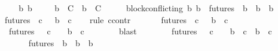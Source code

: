 \begin{isabellebody}
\isamarkupfalse%
\ {\isacharminus}\isanewline
\ \ \isamarkupfalse%
\ b{}\ b{}\ {\isasymsigma}\isanewline
\ \ \isamarkupfalse%
\ {\isachardoublequoteopen}b{}\ {\isasymin}\ C\ {\isasymand}\ b{}\ {\isasymin}\ C\ {\isasymand}\ {\isasymsigma}\ {\isasymin}\ {\isasymSigma}{\isachardoublequoteclose}\ \ {\isachardoublequoteopen}block{\isacharunderscore}conflicting\ {\isacharparenleft}b{}{\isacharcomma}\ b{}{\isacharparenright}{\isachardoublequoteclose}\ \ {\isachardoublequoteopen}{\isasymforall}{\isasymsigma}{\isasymin}futures\ {\isasymsigma}{\isachardot}\ {\isasymforall}b{\isacharprime}{\isasymin}{\isasymepsilon}\ {\isasymsigma}{\isachardot}\ b{}\ {\isasymdownharpoonright}\ b{\isacharprime}{\isachardoublequoteclose}\ \isanewline
\ \ \isamarkupfalse%
\ \ {\isachardoublequoteopen}{\isasymforall}{\isasymsigma}{\isasymin}futures\ {\isasymsigma}{\isachardot}\ {\isasymforall}c{\isasymin}{\isasymepsilon}\ {\isasymsigma}{\isachardot}\ {\isasymnot}\ b{}\ {\isasymdownharpoonright}\ c{\isachardoublequoteclose}\isanewline
\ \ \isamarkupfalse%
\ {\isacharparenleft}rule\ ccontr{\isacharparenright}\isanewline
\ \ \ \ \isamarkupfalse%
\ {\isachardoublequoteopen}{\isasymnot}\ {\isacharparenleft}{\isasymforall}{\isasymsigma}{\isasymin}futures\ {\isasymsigma}{\isachardot}\ {\isasymforall}c{\isasymin}{\isasymepsilon}\ {\isasymsigma}{\isachardot}\ {\isasymnot}\ b{}\ {\isasymdownharpoonright}\ c{\isacharparenright}{\isachardoublequoteclose}\isanewline
\ \ \ \ \isamarkupfalse%
\ {\isachardoublequoteopen}{\isasymexists}\ {\isasymsigma}\ {\isasymin}futures\ {\isasymsigma}{\isachardot}\ {\isasymexists}\ c\ {\isasymin}\ {\isasymepsilon}\ {\isasymsigma}{\isachardot}\ b{}\ {\isasymdownharpoonright}\ c{\isachardoublequoteclose}\isanewline
\ \ \ \ \ \ \isamarkupfalse%
\ blast\isanewline
\ \ \ \ \isamarkupfalse%
\ {\isachardoublequoteopen}{\isasymexists}\ {\isasymsigma}\ {\isasymin}futures\ {\isasymsigma}{\isachardot}\ {\isasymexists}\ c\ {\isasymin}\ {\isasymepsilon}\ {\isasymsigma}{\isachardot}\ b{}\ {\isasymdownharpoonright}\ c\ {\isasymand}\ b{}\ {\isasymdownharpoonright}\ c{\isachardoublequoteclose}\isanewline
\ \ \ \ \ \ \isamarkupfalse%
\ {\isacartoucheopen}{\isasymforall}{\isasymsigma}{\isasymin}futures\ {\isasymsigma}{\isachardot}\ {\isasymforall}b{\isacharprime}{\isasymin}{\isasymepsilon}\ {\isasymsigma}{\isachardot}\ b{}\ {\isasymdownharpoonright}\ b{\isacharprime}{\isacartoucheclose}\ \isamarkupfalse%

\end{isabellebody}
